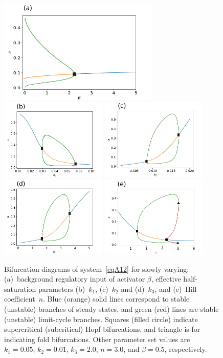 \documentclass[%
 preprint,
 aip, 
 amsmath,amssymb,
]{revtex4-2}
\begin{document}
	
	\begin{figure} %
		\centering
		\includegraphics[width=3in]{ApFigure01a.pdf} \\
		\includegraphics[width=2in]{ApFigure01b}
		\includegraphics[width=2in]{ApFigure01c} \\
		\includegraphics[width=2in]{ApFigure01d}
		\includegraphics[width=2in]{ApFigure01e}
		\caption{Bifurcation diagrams of system~\eqref{eqA12} for slowly varying: (a)~background regulatory input of activator $\beta$, effective half-saturation parameters (b)~$k_1$, (c)~$k_2$ and (d)~$k_3$, and (e)~Hill coefficient~$n$. Blue (orange) solid lines correspond to stable (unstable) branches of steady states, and green (red) lines are stable (unstable) limit-cycle branches. Squares (filled circle) indicate supercritical (subcritical) Hopf bifurcations, and triangle is for indicating fold bifurcations. Other parameter set values are $k_1 = 0.05$, $k_2 = 0.01$, $k_3 = 2.0$, $n=3.0$, and $\beta=0.5$, respectively.}
		\label{FigA01}
	\end{figure}
\end{document}
